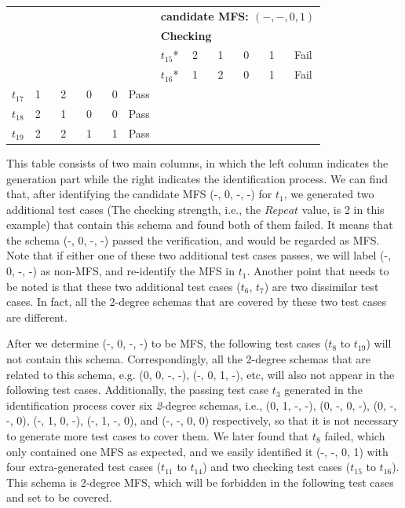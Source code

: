 \documentclass[10pt,journal,compsoc]{IEEEtran}
\begin{document}
\begin{table}[h]
\begin{tabular}{llllll|llllll}
\multicolumn{5}{l}{}& &\multicolumn{6}{l}{ \bfseries{candidate MFS}: $(-, -, 0, 1)$ }  \\
\multicolumn{5}{l}{}& &\multicolumn{6}{l}{ \bfseries{\textbf{Checking}} }  \\
\multicolumn{5}{l}{}& & $t_{15}$* &\multicolumn{4}{l}{2  \ \ \  1 \ \ \  0 \ \ \  1 }& Fail \\
\multicolumn{5}{l}{}& & $t_{16}$* &\multicolumn{4}{l}{1  \ \ \  2 \ \ \  0 \ \ \  1 }& Fail \\
$t_{17}$ &\multicolumn{4}{l}{1  \ \ \  2 \ \ \ 0 \ \ \ 0 } & Pass & \multicolumn{6}{l}{}\\
$t_{18}$ &\multicolumn{4}{l}{2  \ \ \   1 \ \ \ 0  \ \ \  0 } & Pass & \multicolumn{6}{l}{}\\
$t_{19}$ &\multicolumn{4}{l}{2  \ \ \   2 \ \ \ 1  \ \ \  1 } & Pass & \multicolumn{6}{l}{}\\
\hline
\end{tabular}
\end{table}

This table consists of two main columns, in which the left column indicates the generation part while the right indicates the identification process. We can find that, after identifying the candidate MFS (-, 0, -, -) for $t_{1}$, we generated two additional test cases (The checking strength, i.e., the $Repeat$ value, is 2 in this example) that contain this schema and found both of them failed. It means that the schema (-, 0, -, -) passed the verification, and would be regarded as MFS. Note that if either one of these two additional test cases passes, we will label (-, 0, -, -) as non-MFS, and re-identify the MFS in $t_{1}$.  Another point that needs to be noted is that these two additional test cases ($t_{6}$, $t_{7}$) are two dissimilar test cases. In fact, all the 2-degree schemas that are covered by these two test cases are different.


After we determine (-, 0, -, -) to be MFS, the following test cases ($t_{8}$ to $t_{19}$) will not contain this schema. Correspondingly, all the 2-degree schemas that are related to this schema, e.g. (0, 0, -, -), (-, 0, 1, -), etc, will also not appear in the following test cases. Additionally, the passing test case $t_{3}$ generated in the identification process cover six \emph{2}-degree schemas, i.e., (0, 1, -, -), (0, -, 0, -), (0, -, -, 0), (-, 1, 0, -), (-, 1, -, 0), and (-, -, 0, 0) respectively, so that it is not necessary to generate more test cases to cover them. We later found that $t_{8}$ failed, which only contained one MFS as expected, and we easily identified it (-, -, 0, 1) with four extra-generated test cases ($t_{11}$ to $t_{14}$) and two checking test cases ($t_{15}$ to $t_{16}$). This schema is 2-degree MFS, which will be forbidden in the following test cases and set to be covered.
\end{document}
